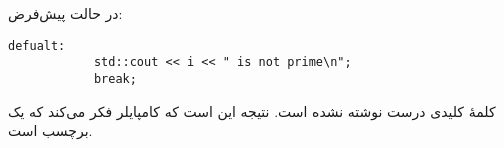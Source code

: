 \section{}
\paragraph{}\label{answer:67}
در حالت پیش‌فرض:
\begin{LTR}
        \begin{lstlisting}[style=C++Style]
        defualt:
            std::cout << i << " is not prime\n";
            break;
        \end{lstlisting}
\end{LTR}

کلمهٔ کلیدی  درست نوشته نشده است. نتیجه این است که کامپایلر  فکر می‌کند که  یک برچسب  است.